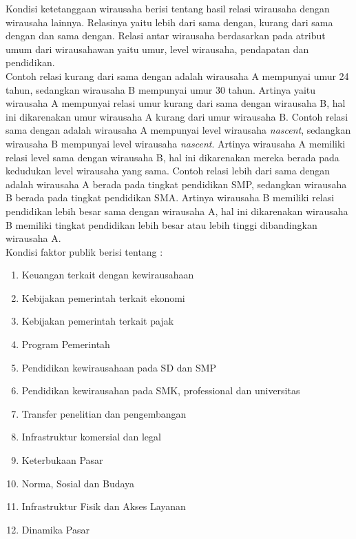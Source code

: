 Kondisi ketetanggaan wirausaha berisi tentang hasil relasi  wirausaha dengan wirausaha lainnya. Relasinya yaitu lebih dari sama dengan, kurang dari sama dengan dan sama dengan. Relasi antar wirausaha berdasarkan pada atribut umum dari wirausahawan yaitu umur, level wirausaha, pendapatan dan pendidikan.\\ Contoh relasi kurang dari sama dengan adalah wirausaha A mempunyai umur 24 tahun, sedangkan wirausaha B mempunyai umur 30 tahun. Artinya yaitu wirausaha A mempunyai relasi umur kurang dari sama dengan wirausaha B, hal ini dikarenakan umur wirausaha A kurang dari umur wirausaha B. Contoh relasi sama dengan adalah wirausaha A mempunyai level wirausaha \textit{nascent}, sedangkan wirausaha B mempunyai level wirausaha \textit{nascent}. Artinya wirausaha A memiliki relasi level sama dengan wirausaha B, hal ini dikarenakan mereka berada pada kedudukan level wirausaha yang sama. Contoh relasi lebih dari sama dengan adalah wirausaha A berada pada tingkat pendidikan SMP, sedangkan wirausaha B berada pada tingkat pendidikan SMA. Artinya wirausaha B memiliki relasi pendidikan lebih besar sama dengan wirausaha A, hal ini dikarenakan wirausaha B memiliki tingkat pendidikan lebih besar atau lebih tinggi dibandingkan wirausaha A.\\
Kondisi faktor publik berisi tentang :
\begin{enumerate}
			\item Keuangan terkait dengan kewirausahaan
			\item Kebijakan pemerintah terkait ekonomi
			\item Kebijakan pemerintah terkait pajak
			\item Program Pemerintah
			\item Pendidikan kewirausahaan pada SD dan SMP
			\item Pendidikan kewirausahan pada SMK, professional dan universitas
			\item Transfer penelitian dan pengembangan
			\item Infrastruktur komersial dan legal
			\item Keterbukaan Pasar
			\item Norma, Sosial dan Budaya
			\item Infrastruktur Fisik dan Akses Layanan
			\item Dinamika Pasar
		 \end{enumerate}
		
